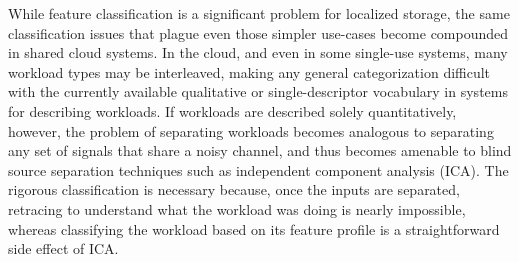 

       
                  


While feature classification is a significant problem for localized storage, the
same classification issues that plague even those simpler use-cases become
compounded in shared cloud systems. In the cloud, and even in some single-use systems, many workload types may be interleaved, making any general
categorization difficult with the currently available qualitative or
single-descriptor vocabulary in systems for describing workloads.  If workloads
are described solely quantitatively, however, the problem of separating
workloads becomes analogous to separating any set of signals that share a noisy
channel, and thus becomes amenable to blind source separation techniques such as
independent component analysis (ICA).  The rigorous classification is necessary
because, once the inputs are separated, retracing to understand what the
workload was doing is nearly impossible, whereas classifying the workload based
on its feature profile is a straightforward side effect of ICA.  

